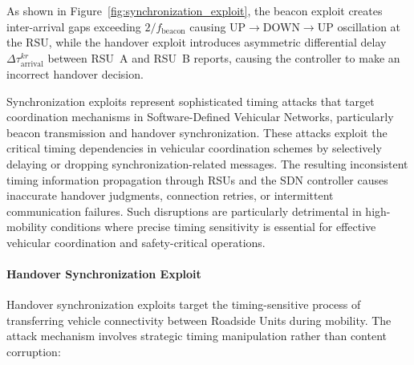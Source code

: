 As shown in Figure~\ref{fig:synchronization_exploit}, the
beacon exploit creates inter-arrival gaps exceeding
$2/f_{\mathrm{beacon}}$ causing UP$\to$DOWN$\to$UP
oscillation at the RSU, while the handover exploit introduces
asymmetric differential delay $\Delta\tau_{\mathrm{arrival}}^{kr}$
between RSU~A and RSU~B reports, causing the controller to
make an incorrect handover decision.


Synchronization exploits represent sophisticated timing attacks that target coordination mechanisms in Software-Defined Vehicular Networks, particularly beacon transmission and handover synchronization. These attacks exploit the critical timing dependencies in vehicular coordination schemes by selectively delaying or dropping synchronization-related messages. The resulting inconsistent timing information propagation through RSUs and the SDN controller causes inaccurate handover judgments, connection retries, or intermittent communication failures. Such disruptions are particularly detrimental in high-mobility conditions where precise timing sensitivity is essential for effective vehicular coordination and safety-critical operations.

\paragraph{Handover Synchronization Exploit}
Handover synchronization exploits target the timing-sensitive process of transferring vehicle connectivity between Roadside Units during mobility. The attack mechanism involves strategic timing manipulation rather than content corruption:

